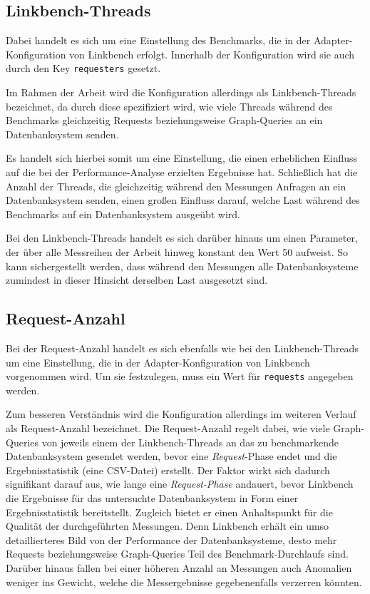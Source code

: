 \subsection{Linkbench-Threads}
\label{analyse:linkbench:threads}
Dabei handelt es sich um eine Einstellung des Benchmarks, die in der Adapter-Konfiguration von Linkbench erfolgt. Innerhalb der Konfiguration wird sie auch durch den Key \texttt{requesters} gesetzt. 

Im Rahmen der Arbeit wird die Konfiguration allerdings als Linkbench-Threads bezeichnet, da durch diese spezifiziert wird, wie viele Threads während des Benchmarks gleichzeitig Requests beziehungsweise Graph-Queries an ein Datenbanksystem senden.

Es handelt sich hierbei somit um eine Einstellung, die einen erheblichen Einfluss auf die bei der Performance-Analyse erzielten Ergebnisse hat. Schließlich hat die Anzahl der Threads, die gleichzeitig während den Messungen Anfragen an ein Datenbanksystem senden, einen großen Einfluss darauf, welche Last während des Benchmarks auf ein Datenbanksystem ausgeübt wird. 

Bei den Linkbench-Threads handelt es sich darüber hinaus um einen Parameter, der über alle Messreihen der Arbeit hinweg konstant den Wert 50 aufweist. So kann sichergestellt werden, dass während den Messungen alle Datenbanksysteme zumindest in dieser Hinsicht derselben Last ausgesetzt sind. 

\subsection{Request-Anzahl}
\label{analyse:request_anzahl}
Bei der Request-Anzahl handelt es sich ebenfalls wie bei den Linkbench-Threads um eine Einstellung, die in der Adapter-Konfiguration von Linkbench vorgenommen wird. Um sie festzulegen, muss ein Wert für \texttt{requests} angegeben werden. 

Zum besseren Verständnis wird die Konfiguration allerdings im weiteren Verlauf als Request-Anzahl bezeichnet. Die Request-Anzahl regelt dabei, wie viele Graph-Queries von jeweils einem der Linkbench-Threads an das zu benchmarkende Datenbanksystem gesendet werden, bevor eine \textit{Request}-Phase endet und die Ergebnisstatistik (eine CSV-Datei) erstellt. Der Faktor wirkt sich dadurch signifikant darauf aus, wie lange eine \textit{Request-Phase} andauert, bevor Linkbench die Ergebnisse für das untersuchte Datenbanksystem in Form einer Ergebnisstatistik bereitstellt. Zugleich bietet er einen Anhaltspunkt für die Qualität der durchgeführten Messungen. Denn Linkbench erhält ein umso detaillierteres Bild von der Performance der Datenbanksysteme, desto mehr Requests beziehungsweise Graph-Queries Teil des Benchmark-Durchlaufs sind. Darüber hinaus fallen bei einer höheren Anzahl an Messungen auch Anomalien weniger ins Gewicht, welche die Messergebnisse gegebenenfalls verzerren könnten.

